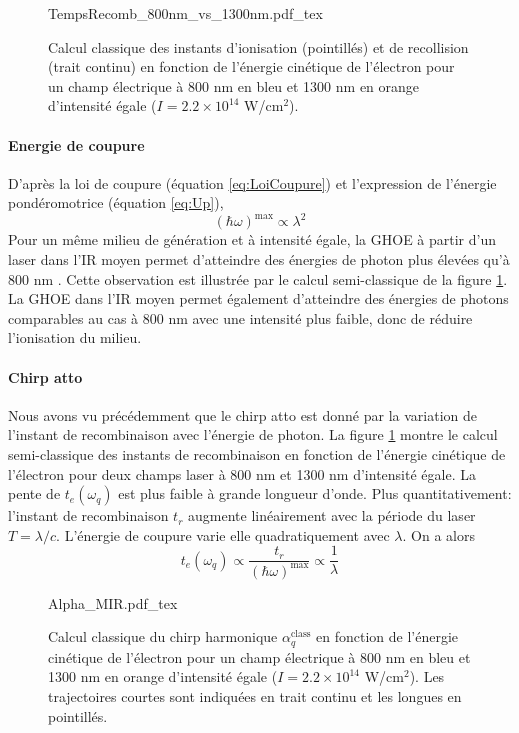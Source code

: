\begin{figure}[ht]
\centering
\def\svgwidth{0.7\columnwidth}
{TempsRecomb_800nm_vs_1300nm.pdf_tex}
\caption{Calcul classique des instants d'ionisation (pointillés) et de recollision (trait continu) en fonction de l'énergie cinétique de l'électron pour un champ électrique à 800 nm en bleu et 1300 nm en orange d'intensité égale ($I = 2.2 \times 10^{14}$ W/cm$^2$).}
\label{fig:Recomb_vs_Lambda}
\end{figure}

\paragraph{Energie de coupure} D'après la loi de coupure (équation \ref{eq:LoiCoupure}) et l'expression de l'énergie pondéromotrice (équation \ref{eq:Up}),
\begin{equation}
(\hbar \omega)^{\text{max}} \propto \lambda^2
\end{equation}
Pour un même milieu de génération et à intensité égale, la GHOE à partir d'un laser dans l'IR moyen permet d'atteindre des énergies de photon plus élevées qu'à 800 nm .  Cette observation est illustrée par le calcul semi-classique de la figure \ref{fig:Recomb_vs_Lambda}. La GHOE dans l'IR moyen permet également d'atteindre des énergies de photons comparables au cas à 800 nm avec une intensité plus faible, donc de réduire l'ionisation du milieu.

\paragraph{Chirp atto} Nous avons vu précédemment que le chirp atto est donné par la variation de l'instant de recombinaison avec l'énergie de photon. La figure \ref{fig:Recomb_vs_Lambda} montre le calcul semi-classique des instants de recombinaison en fonction de l'énergie cinétique de l'électron pour deux champs laser à 800 nm et 1300 nm d'intensité égale. La pente de $t_e(\omega_q)$ est plus faible à grande longueur d'onde. Plus quantitativement: l'instant de recombinaison $t_r$ augmente linéairement avec la période du laser $T = \lambda/c$. L'énergie de coupure varie elle quadratiquement avec $\lambda$. On a alors
\begin{equation}
t_e (\omega_q) \propto \frac{t_r}{(\hbar \omega)^{\text{max}}} \propto \frac{1}{\lambda}
\end{equation}

\begin{figure}
\centering
\def\svgwidth{0.7\columnwidth}
{Alpha_MIR.pdf_tex}
\caption{Calcul classique du chirp harmonique $\alpha_q^{\text{class}}$ en fonction de l'énergie cinétique de l'électron pour un champ électrique à 800 nm en bleu et 1300 nm en orange d'intensité égale ($I = 2.2 \times 10^{14}$ W/cm$^2$). Les trajectoires courtes sont indiquées en trait continu et les longues en pointillés.}
\label{fig:AlphaMIR}
\end{figure}

